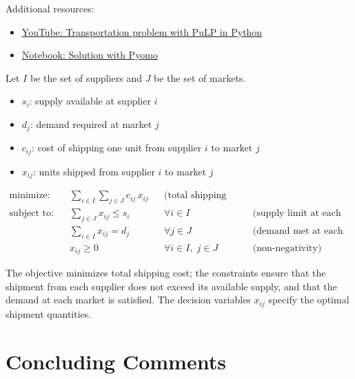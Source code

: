 \noindent Additional resources:
\begin{itemize}
\item \href{https://www.youtube.com/watch?v=Jr7LI-sUEmo}{YouTube: Transportation problem with PuLP in Python}
\item \href{https://nbviewer.jupyter.org/github/Pyomo/PyomoGallery/blob/master/transport/transport.ipynb}{Notebook: Solution with Pyomo}
\end{itemize}

Let $I$ be the set of suppliers and $J$ be the set of markets.

\begin{itemize}
\item $s_i$: supply available at supplier $i$
\item $d_j$: demand required at market $j$
\item $c_{ij}$: cost of shipping one unit from supplier $i$ to market $j$
\end{itemize}

\begin{itemize}
\item $x_{ij}$: units shipped from supplier $i$ to market $j$
\end{itemize}

\begin{align*}
\text{minimize:} \quad &\sum_{i\in I}\sum_{j \in J} c_{ij}\,x_{ij} && \text{(total shipping cost)}\\
\text{subject to:} \quad &\sum_{j\in J} x_{ij} \leq s_i && \forall i \in I && \text{(supply limit at each supplier)}\\
&\sum_{i\in I} x_{ij} = d_j && \forall j \in J && \text{(demand met at each market)}\\
& x_{ij} \geq 0 && \forall i\in I,\; j\in J && \text{(non-negativity)}
\end{align*}

The objective minimizes total shipping cost; the constraints ensure that the shipment from each supplier does not exceed its available supply, and that the demand at each market is satisfied. The decision variables $x_{ij}$ specify the optimal shipment quantities.

\section*{Concluding Comments}

